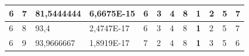 \documentclass[conference]{IEEEtran}
\begin{document}
\begin{table}[]
\begin{tabular}{|llll|llllllll|}
\multicolumn{1}{|l|}{6}                                                     & \multicolumn{1}{l|}{7}                                                        & \multicolumn{1}{l|}{81,5444444}                                                   & 6,6675E-15                     & \multicolumn{1}{l|}{6}                                                  & \multicolumn{1}{l|}{3}                                                  & \multicolumn{1}{l|}{4}                                                  & \multicolumn{1}{l|}{8}                                                  & \multicolumn{1}{l|}{\textbf{1}}                                         & \multicolumn{1}{l|}{2}                                                  & \multicolumn{1}{l|}{5}                                                  & 7                          \\ \hline
\multicolumn{1}{|l|}{6}                                                     & \multicolumn{1}{l|}{8}                                                        & \multicolumn{1}{l|}{93,4}                                                         & 2,4747E-17                     & \multicolumn{1}{l|}{6}                                                  & \multicolumn{1}{l|}{3}                                                  & \multicolumn{1}{l|}{4}                                                  & \multicolumn{1}{l|}{8}                                                  & \multicolumn{1}{l|}{\textbf{1}}                                         & \multicolumn{1}{l|}{2}                                                  & \multicolumn{1}{l|}{5}                                                  & 7                          \\ \hline
\multicolumn{1}{|l|}{6}                                                     & \multicolumn{1}{l|}{9}                                                        & \multicolumn{1}{l|}{93,9666667}                                                   & 1,8919E-17                     & \multicolumn{1}{l|}{7}                                                  & \multicolumn{1}{l|}{2}                                                  & \multicolumn{1}{l|}{4}                                                  & \multicolumn{1}{l|}{8}                                                  & \multicolumn{1}{l|}{\textbf{1}}                                         & \multicolumn{1}{l|}{3}                                                  & \multicolumn{1}{l|}{5}                                                  & 6                          \\ \hline

\end{tabular}
\end{table}
\end{document}
